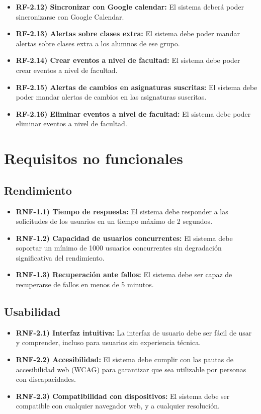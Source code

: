 \begin{itemize}
\begin{itemize}
        \item \textbf{RF-2.12) Sincronizar con Google calendar:} El sistema deberá poder sincronizarse con Google Calendar.
        \item \textbf{RF-2.13) Alertas sobre clases extra:} El sistema debe poder mandar alertas sobre clases extra a los alumnos de ese grupo.
        \item \textbf{RF-2.14) Crear eventos a nivel de facultad:} El sistema debe poder crear eventos a nivel de facultad.
        \item \textbf{RF-2.15) Alertas de cambios en asignaturas suscritas:} El sistema debe poder mandar alertas de cambios en las asignaturas suscritas.
        \item \textbf{RF-2.16) Eliminar eventos a nivel de facultad:} El sistema debe poder eliminar eventos a nivel de facultad.
    \end{itemize}
\end{itemize}

\section{Requisitos no funcionales}

\subsection{Rendimiento}

\begin{itemize}
    \item \textbf{RNF-1.1) Tiempo de respuesta:} El sistema debe responder a las solicitudes de los usuarios en un tiempo máximo de 2 segundos.
    \item \textbf{RNF-1.2) Capacidad de usuarios concurrentes:} El sistema debe soportar un mínimo de 1000 usuarios concurrentes sin degradación significativa del rendimiento.    \item \textbf{RNF-1.3) Recuperación ante fallos:} El sistema debe ser capaz de recuperarse de fallos en menos de 5 minutos.
\end{itemize}

\subsection{Usabilidad}

\begin{itemize}
    \item \textbf{RNF-2.1) Interfaz intuitiva:} La interfaz de usuario debe ser fácil de usar y comprender, incluso para usuarios sin experiencia técnica.
    \item \textbf{RNF-2.2) Accesibilidad:} El sistema debe cumplir con las pautas de accesibilidad web (WCAG) para garantizar que sea utilizable por personas con discapacidades.
    \item \textbf{RNF-2.3) Compatibilidad con dispositivos:} El sistema debe ser compatible con cualquier navegador web, y a cualquier resolución.
\end{itemize}

